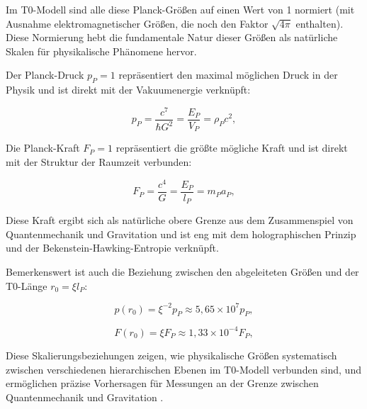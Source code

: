 \documentclass[twocolumn,aps,prl]{revtex4-2}
\begin{document}
{{{{{{{{{{{{{{{																	Im T0-Modell sind alle diese Planck-Größen auf einen Wert von 1 normiert (mit Ausnahme elektromagnetischer Größen, die noch den Faktor \(\sqrt{4\pi}\) enthalten). Diese Normierung hebt die fundamentale Natur dieser Größen als natürliche Skalen für physikalische Phänomene hervor.
																	
																	Der Planck-Druck \(p_P = 1\) repräsentiert den maximal möglichen Druck in der Physik und ist direkt mit der Vakuumenergie verknüpft:
																	
																	\begin{equation}
																		p_P = \frac{c^7}{\hbar G^2} = \frac{E_P}{V_P} = \rho_P c^2, \label{eq:planck_pressure}
																	\end{equation}
																	
																	Die Planck-Kraft \(F_P = 1\) repräsentiert die größte mögliche Kraft und ist direkt mit der Struktur der Raumzeit verbunden:
																	
																	\begin{equation}
																		F_P = \frac{c^4}{G} = \frac{E_P}{l_P} = m_P a_P, \label{eq:planck_force}
																	\end{equation}
																	
																	Diese Kraft ergibt sich als natürliche obere Grenze aus dem Zusammenspiel von Quantenmechanik und Gravitation und ist eng mit dem holographischen Prinzip und der Bekenstein-Hawking-Entropie verknüpft.
																	
																	Bemerkenswert ist auch die Beziehung zwischen den abgeleiteten Größen und der T0-Länge \(r_0 = \xi l_P\):
																	
																	\begin{equation}
																		p(r_0) = \xi^{-2} p_P \approx 5{,}65 \times 10^7 p_P, \label{eq:r0_pressure}
																	\end{equation}
																	
																	\begin{equation}
																		F(r_0) = \xi F_P \approx 1{,}33 \times 10^{-4} F_P, \label{eq:r0_force}
																	\end{equation}
																	
																	Diese Skalierungsbeziehungen zeigen, wie physikalische Größen systematisch zwischen verschiedenen hierarchischen Ebenen im T0-Modell verbunden sind, und ermöglichen präzise Vorhersagen für Messungen an der Grenze zwischen Quantenmechanik und Gravitation \cite{pascher_emergente_2025}.
																	
}}}}}}}}}}}}}}}
\end{document}
